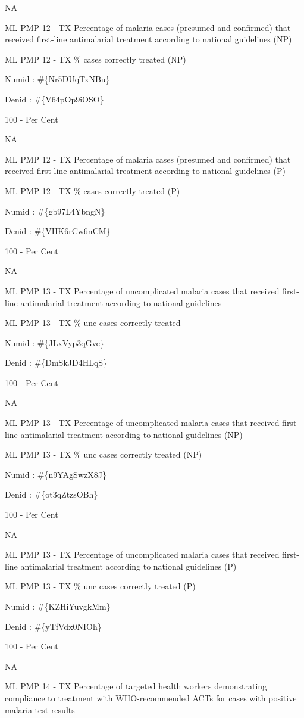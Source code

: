 \documentclass[]{book}
\begin{document}
NA

ML PMP 12 - TX Percentage of malaria cases (presumed and confirmed) that received first-line antimalarial treatment according to national guidelines (NP)

ML PMP 12 - TX \% cases correctly treated (NP)

Numid : \#\{Nr5DUqTxNBu\}

Denid : \#\{V64pOp9iOSO\}

100 - Per Cent

NA

ML PMP 12 - TX Percentage of malaria cases (presumed and confirmed) that received first-line antimalarial treatment according to national guidelines (P)

ML PMP 12 - TX \% cases correctly treated (P)

Numid : \#\{gb97L4YbngN\}

Denid : \#\{VHK6rCw6nCM\}

100 - Per Cent

NA

ML PMP 13 - TX Percentage of uncomplicated malaria cases that received first-line antimalarial treatment according to national guidelines

ML PMP 13 - TX \% unc cases correctly treated

Numid : \#\{JLxVyp3qGve\}

Denid : \#\{DmSkJD4HLqS\}

100 - Per Cent

NA

ML PMP 13 - TX Percentage of uncomplicated malaria cases that received first-line antimalarial treatment according to national guidelines (NP)

ML PMP 13 - TX \% unc cases correctly treated (NP)

Numid : \#\{n9YAgSwzX8J\}

Denid : \#\{ot3qZtzsOBh\}

100 - Per Cent

NA

ML PMP 13 - TX Percentage of uncomplicated malaria cases that received first-line antimalarial treatment according to national guidelines (P)

ML PMP 13 - TX \% unc cases correctly treated (P)

Numid : \#\{KZHiYuvgkMm\}

Denid : \#\{yTfVdx0NIOh\}

100 - Per Cent

NA

ML PMP 14 - TX Percentage of targeted health workers demonstrating compliance to treatment with WHO-recommended ACTs for cases with positive malaria test results
\end{document}
